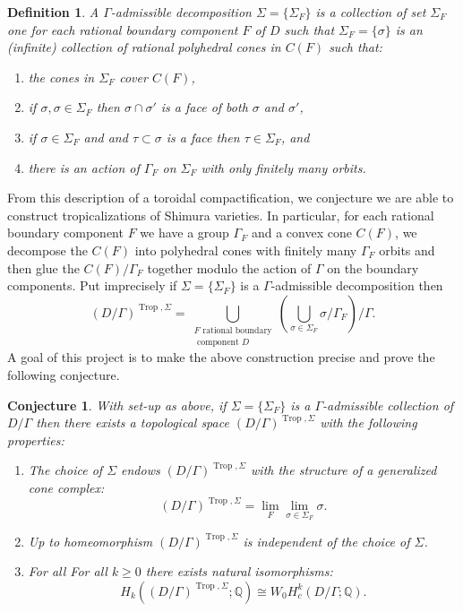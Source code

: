 \documentclass[11pt,reqno]{amsart}
\newtheorem{conj}[lemma]{Conjecture}
\newtheorem{defn}[lemma]{Definition}
\theoremstyle{remark}
\newcommand{\QQ}{\mathbb{Q}}
\DeclareMathOperator{\Trop}{Trop}
\begin{document}
\begin{defn}
A $\Gamma$-admissible decomposition $\Sigma=\{\Sigma_{F}\}$ is a collection of set $\Sigma_{F}$ one for each rational boundary component $F$ of $D$ such that $\Sigma_{F}=\{\sigma\}$ is an (infinite) collection of rational polyhedral cones in $C(F)$ such that:
\begin{enumerate}
\item the cones in $\Sigma_{F}$ cover $C(F)$,
\item if $\sigma,\sigma\in \Sigma_{F}$ then $\sigma\cap \sigma'$ is a face of both $\sigma$ and $\sigma'$,
\item if $\sigma \in \Sigma_{F}$ and and $\tau \subset \sigma$ is a face then $\tau\in \Sigma_{F}$, and
\item there is an action of $\Gamma_{F}$ on $\Sigma_{F}$ with only finitely many orbits. 
\end{enumerate}
\end{defn}

From this description of a toroidal compactification, we conjecture we are able to construct tropicalizations of Shimura varieties. In particular, for each rational boundary component $F$ we have a group $\Gamma_F$ and a convex cone $C(F)$, we decompose the $C(F)$ into polyhedral cones with finitely many $\Gamma_F$ orbits and then glue the $C(F)/\Gamma_{F}$ together modulo the action of $\Gamma$ on the boundary components. Put imprecisely if $\Sigma=\{\Sigma_{F}\}$ is a $\Gamma$-admissible decomposition then
\[
\left(D/\Gamma\right)^{\Trop,\Sigma} =\bigcup_{\substack{\text{$F$ rational boundary}\\ \text{ component $D$}}} \left(\bigcup_{\sigma \in \Sigma_{F}} \sigma\big/ \Gamma_{F}\right)\big/\Gamma.
\]
A goal of this project is to make the above construction precise and prove the following conjecture. 

\begin{conj}\label{con:main}
    With set-up as above, if $\Sigma=\{\Sigma_{F}\}$ is a $\Gamma$-admissible collection of $D/\Gamma$ then there exists a topological space $(D/\Gamma)^{\Trop,\Sigma}$ with the following properties:
    \begin{enumerate}
    	\item The choice of $\Sigma$ endows $(D/\Gamma)^{\Trop, \Sigma}$ with the structure of a generalized cone complex:
	\[
	\left(D/\Gamma\right)^{\Trop,\Sigma}=\lim_{F}\lim_{\sigma \in \Sigma_{F}} \sigma.
	\]
    	\item Up to homeomorphism $(D/\Gamma)^{\Trop,\Sigma}$ is independent of the choice of $\Sigma$.
	\item For all For all $k\geq0$ there exists natural isomorphisms:
	\[
        H_{k}\left((D/\Gamma)^{\Trop,\Sigma}; \QQ\right) \cong W_{0}H_{c}^{k}\left(D/\Gamma;\QQ\right).
        \]
        \end{enumerate}
\end{conj}
\end{document}
